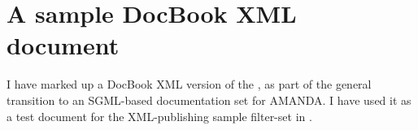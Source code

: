 












\section{A sample DocBook XML document}
\label{sec:amanda-readme.xml}

I have marked up a DocBook XML version of the
, as part of the general transition to an
SGML-based documentation set for AMANDA.  I have used it as a test
document for the XML-publishing sample filter-set in
.

